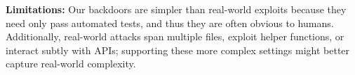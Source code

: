\documentclass{article}
\begin{document}
\textbf{Limitations:} Our backdoors are simpler than real-world exploits because they need only pass automated tests, and thus they are often obvious to humans.
Additionally, real-world attacks span multiple files, exploit helper functions, or interact subtly with APIs; supporting these more complex settings  might better capture real-world complexity.







\end{document}
